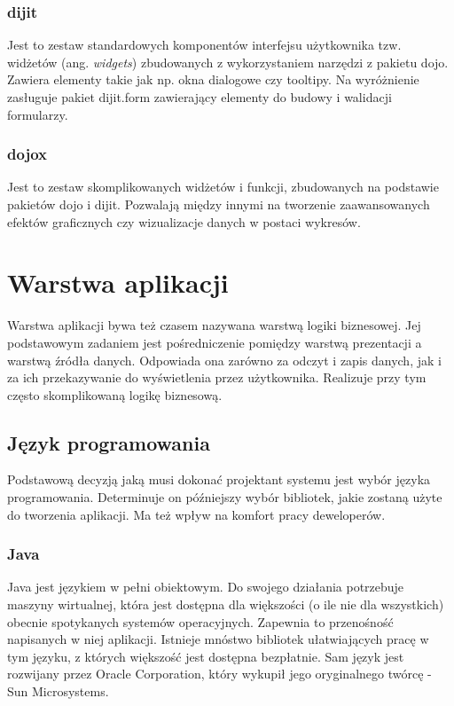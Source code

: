 \subsubsection[dijit][dijit]{dijit}
Jest to zestaw standardowych komponentów interfejsu użytkownika tzw. widżetów (ang. \textit{widgets}) zbudowanych z wykorzystaniem narzędzi z pakietu dojo. Zawiera elementy takie jak np. okna dialogowe czy tooltipy. Na wyróżnienie zasługuje pakiet dijit.form zawierający elementy do budowy i walidacji formularzy.
 
\subsubsection[dojox][dojox]{dojox}
Jest to zestaw skomplikowanych widżetów i funkcji, zbudowanych na podstawie pakietów dojo i dijit. Pozwalają między innymi na tworzenie zaawansowanych efektów graficznych czy wizualizacje danych w postaci wykresów.
 
\section[Warstwa aplikacji][Warstwa aplikacji]{Warstwa aplikacji}
Warstwa aplikacji bywa też czasem nazywana warstwą logiki biznesowej. Jej podstawowym zadaniem jest pośredniczenie pomiędzy warstwą prezentacji a warstwą źródła danych. Odpowiada ona zarówno za odczyt i zapis danych, jak i za ich przekazywanie do wyświetlenia przez użytkownika. Realizuje przy tym często skomplikowaną logikę biznesową.

\subsection[Język programowania][Język programowania]{Język programowania}
Podstawową decyzją jaką musi dokonać projektant systemu jest wybór języka programowania. Determinuje on późniejszy wybór bibliotek, jakie zostaną użyte do tworzenia aplikacji. Ma też wpływ na komfort pracy deweloperów.

\subsubsection{Java}
Java jest językiem w pełni obiektowym. Do swojego działania potrzebuje maszyny wirtualnej, która jest dostępna dla większości (o ile nie dla wszystkich) obecnie spotykanych systemów operacyjnych. Zapewnia to przenośność napisanych w niej aplikacji. Istnieje mnóstwo bibliotek ułatwiających pracę w tym języku, z których większość jest dostępna bezpłatnie. Sam język jest rozwijany przez Oracle Corporation, który wykupił jego oryginalnego twórcę - Sun Microsystems.

